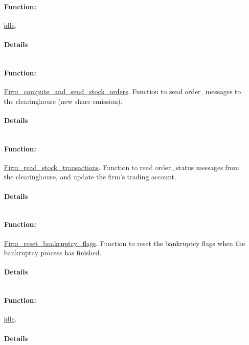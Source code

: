\documentclass[a4paper,11pt]{article}
\begin{document}
\paragraph{Function:}\url{idle}.

\paragraph{Details}
\begin{verbatim}
\end{verbatim}
\paragraph{Function:}\url{Firm_compute_and_send_stock_orders}.
Function to send order\_messages to the clearinghouse (new share emission).
\paragraph{Details}
\begin{verbatim}
\end{verbatim}
\paragraph{Function:}\url{Firm_read_stock_transactions}.
Function to read order\_status messages from the clearinghouse, and update the firm's trading account.
\paragraph{Details}
\begin{verbatim}
\end{verbatim}
\paragraph{Function:}\url{Firm_reset_bankruptcy_flags}.
Function to reset the bankruptcy flags when the bankruptcy process has finished.
\paragraph{Details}
\begin{verbatim}
\end{verbatim}
\paragraph{Function:}\url{idle}.

\paragraph{Details}
\begin{verbatim}
\end{verbatim}
\end{document}
